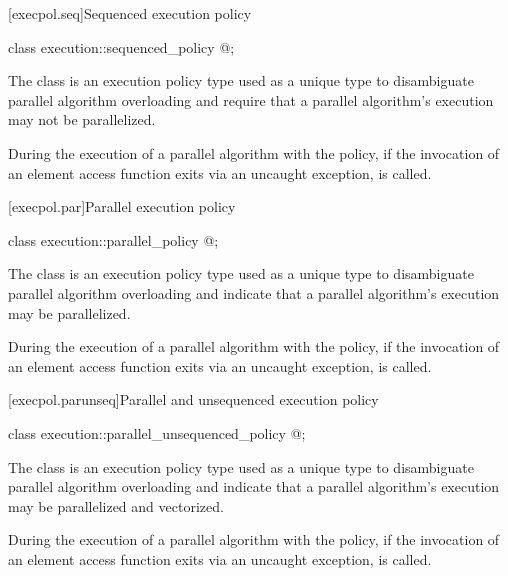 [execpol.seq]{Sequenced execution policy}

%
\begin{itemdecl}
class execution::sequenced_policy { @\unspec@ };
\end{itemdecl}

\begin{itemdescr}
\pnum
The class  is an execution policy type used
as a unique type to disambiguate parallel algorithm overloading and require
that a parallel algorithm's execution may not be parallelized.

\pnum
During the execution of a parallel algorithm with
the  policy,
if the invocation of an element access function exits via an uncaught exception,
 is called.
\end{itemdescr}

[execpol.par]{Parallel execution policy}

%
\begin{itemdecl}
class execution::parallel_policy { @\unspec@ };
\end{itemdecl}

\begin{itemdescr}
\pnum
The class  is an execution policy type used as
a unique type to disambiguate parallel algorithm overloading and indicate that
a parallel algorithm's execution may be parallelized.

\pnum
During the execution of a parallel algorithm with
the  policy,
if the invocation of an element access function exits via an uncaught exception,
 is called.
\end{itemdescr}

[execpol.parunseq]{Parallel and unsequenced execution policy}

%
\begin{itemdecl}
class execution::parallel_unsequenced_policy { @\unspec@ };
\end{itemdecl}

\begin{itemdescr}
\pnum
The class  is an execution policy type
used as a unique type to disambiguate parallel algorithm overloading and
indicate that a parallel algorithm's execution may be parallelized and
vectorized.

\pnum
During the execution of a parallel algorithm with
the  policy,
if the invocation of an element access function exits via an uncaught exception,
 is called.
\end{itemdescr}

